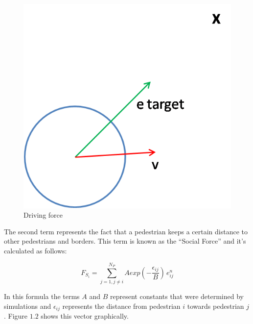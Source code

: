 \documentclass[english]{article}
\numberwithin{equation}{section}
\numberwithin{figure}{section}
\begin{document}
\begin{figure}[H]
\begin{centering}
\includegraphics[scale=0.4]{pics/sfm/drivingforce}
\par\end{centering}

\protect\caption{\label{fig:driving-force}Driving force}
\end{figure}


\vspace{1cm}


The second term represents the fact that a pedestrian keeps a certain
distance to other pedestrians and borders. This term is known as the
``Social Force'' and it's calculated as follows:

\[
F_{S_{i}}=\sum_{j=1,j\ne i}^{N_{P}}Aexp(-\frac{\epsilon_{ij}}{B})\, e_{ij}^{n}
\]


In this formula the terms $A$ and $B$ represent constants that
were determined by simulations and $\epsilon_{ij}$ represents the
distance from pedestrian $i$ towards pedestrian $j$. Figure $1.2$
shows this vector graphically. 
\end{document}
